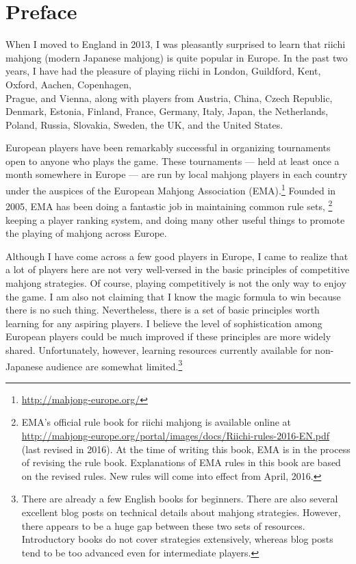 \chapter{Preface}
\thispagestyle{empty}

When I moved to England in 2013, I was pleasantly surprised to learn that riichi mahjong (modern Japanese mahjong) is quite popular in Europe. In the past two years, I have had the pleasure of playing riichi in London, Guildford, Kent, Oxford, Aachen, Copenhagen,\\ Prague, and Vienna, along with players from Austria, China, Czech Republic, Denmark, Estonia, Finland, France, Germany, Italy, Japan, the Netherlands, Poland, Russia, Slovakia, Sweden, the UK, and the United States.

\bigskip
European players have been remarkably successful in organizing tournaments open to anyone who plays the game. These tournaments --- held at least once a month somewhere in Europe --- are run by local mahjong players in each country under the auspices of the European Mahjong Association (EMA).\footnote{\url{http://mahjong-europe.org/}} 
Founded in 2005, EMA has been doing a fantastic job in maintaining common rule sets,%
\footnote{EMA's official rule book for riichi mahjong is available online at \url{http://mahjong-europe.org/portal/images/docs/Riichi-rules-2016-EN.pdf} (last revised in 2016). At the time of writing this book, EMA is in the process of revising the rule book.
Explanations of EMA rules in this book are based on the revised rules. New rules will come into effect from April, 2016.
}
keeping a player ranking system, and doing many other useful things to promote the playing of mahjong across Europe.

\bigskip
Although I have come across a few good players in Europe, I came to realize that a lot of players here are not very well-versed in the basic principles of competitive mahjong strategies. Of course, playing competitively is not the only way to enjoy the game.
I am also not claiming that I know the magic formula to win because there is no such thing. Nevertheless, there is a set of basic principles worth learning for any aspiring players. I believe the level of sophistication among European players could be much improved if these principles are more widely shared. Unfortunately, however, learning resources currently available for non-Japanese audience are somewhat limited.\footnote{There are already a few English books for beginners. There are also several excellent blog posts on technical details about mahjong strategies. However, there appears to be a huge gap between these two sets of resources. Introductory books do not cover strategies extensively, whereas blog posts tend to be too advanced even for intermediate players.}

